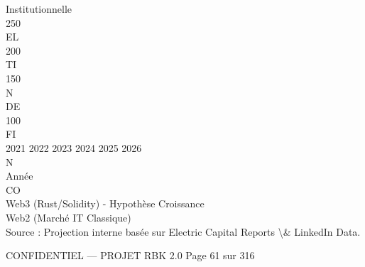 Institutionnelle\\
\vspace{0.5em}
250\\
\vspace{0.5em}
\vspace{0.5em}
\vspace{0.5em}
\vspace{0.5em}
EL\\
200\\
\vspace{0.5em}
\vspace{0.5em}
\vspace{0.5em}
\vspace{0.5em}
TI\\
150\\
\vspace{0.5em}
\vspace{0.5em}
\vspace{0.5em}
\vspace{0.5em}
N\\
DE\\
100\\
\vspace{0.5em}
\vspace{0.5em}
\vspace{0.5em}
\vspace{0.5em}
FI\\
2021                            2022                    2023                                              2024                2025                  2026\\
\vspace{0.5em}
\vspace{0.5em}
\vspace{0.5em}
N\\
Année\\
CO\\
Web3 (Rust/Solidity) - Hypothèse Croissance\\
Web2 (Marché IT Classique)\\
\vspace{0.5em}
\vspace{0.5em}
\vspace{0.5em}
\vspace{0.5em}
Source : Projection interne basée sur Electric Capital Reports \textbackslash{}& LinkedIn Data.\\
\vspace{0.5em}
\vspace{0.5em}
\vspace{0.5em}
\vspace{0.5em}
\begin{confidential}CONFIDENTIEL — PROJET RBK 2.0                                                                                         Page 61 sur 316\end{confidential}
